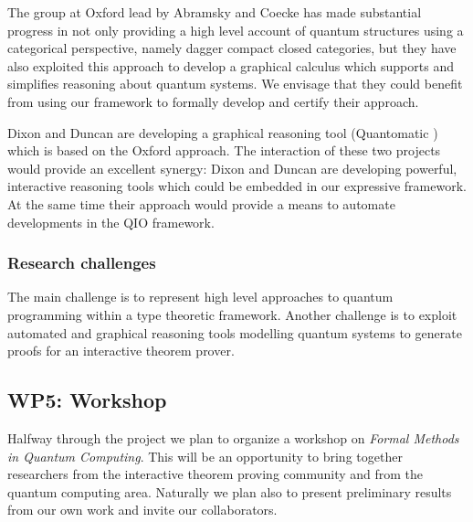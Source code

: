 \documentclass[a4paper]{article}
\begin{document}
The group at Oxford lead by Abramsky and Coecke has made substantial
progress in not only providing a high level account of quantum
structures using a categorical perspective, namely dagger compact
closed categories, but they have also exploited this approach to
develop a graphical calculus which supports and simplifies reasoning
about quantum systems. We envisage that they could benefit from using
our framework to formally develop and certify their approach.

Dixon and Duncan are developing a graphical reasoning tool
(Quantomatic ) which is based on the Oxford approach. 
The interaction
of these two projects would provide an excellent synergy: Dixon and
Duncan are developing powerful, interactive reasoning tools which could
be embedded in our expressive framework. At the same time their
approach would provide a means to automate developments in the QIO
framework. 

\subsubsection*{Research challenges}

The main challenge is to represent high level approaches to quantum
programming within a type theoretic framework. Another challenge is to
exploit automated and graphical reasoning tools modelling quantum
systems to generate proofs for an interactive theorem prover. 

\subsection*{WP5: Workshop}
\label{sec:wp5:-summerschool}

Halfway through the project we plan to organize a workshop on
\emph{Formal Methods in Quantum Computing}. This will be an
opportunity to bring together researchers from the interactive theorem
proving community and from the quantum computing area. Naturally we
plan also to present preliminary results from our own work and invite
our collaborators.


\end{document}
